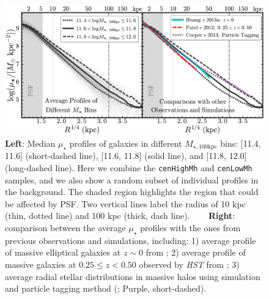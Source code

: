 \documentclass{emulateapj}
\def\rbcg{\texttt{cenHighMh}}
\def\nbcg{\texttt{cenLowMh}}
\def\mtot{{$M_{\star,100\mathrm{kpc}}$}}
\def\mden{{$\mu_{\star}$}}
\begin{document}
\begin{CJK*}{UTF8}{gbsn}
  \begin{figure}[bt!]
      \centering 
      \includegraphics[width=\textwidth]{fig/average_mass_profiles_fsps1_A}
      \caption{
          \textbf{Left}: Median \mden{} profiles of galaxies in different \mtot{} bins:
      	  [11.4, 11.6] (short-dashed line), [11.6, 11.8] (solid line), and 
      	  [11.8, 12.0] (long-dashed line). 
      	  Here we combine the \rbcg{} and \nbcg{} samples, and we also show a random 
      	  subset of individual profiles in the background.
      	  The shaded region highlights the region that could be affected by PSF.
          Two vertical lines label the radius of 10 kpc (thin, dotted line) and
          100 kpc (thick, dash line). ~~~ 
          \textbf{Right}: comparison between the average \mden{} profiles with the ones 
          from previous observations and simulations, including: 
          1) average profile of massive elliptical galaxies at $z\sim 0$ from 
          \citet[][Cyan, solid]{Huang2013a}; 
          2) average profile of massive galaxies at $0.25 \leq z < 0.50$ observed by 
          \textit{HST} from \citet[][Red, long-dashed]{Patel2013} ;
          3) average radial stellar distributions in massive halos using simulation and 
          particle tagging method (\citealt{Cooper13}; Purple, short-dashed).
          }
      \label{fig:avg_prof}
  \end{figure}


\end{CJK*}
\end{document}
